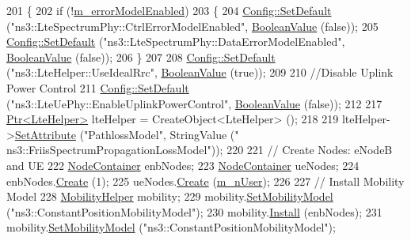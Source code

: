 \begin{DoxyCode}
201 \{
202   \textcolor{keywordflow}{if} (!\hyperlink{classLenaTdBetFfMacSchedulerTestCase1_a2762c9502708f6f310699f8195d81473}{m\_errorModelEnabled})
203     \{
204       \hyperlink{group__config_ga2e7882df849d8ba4aaad31c934c40c06}{Config::SetDefault} (\textcolor{stringliteral}{"ns3::LteSpectrumPhy::CtrlErrorModelEnabled"}, 
      \hyperlink{classns3_1_1BooleanValue}{BooleanValue} (\textcolor{keyword}{false}));
205       \hyperlink{group__config_ga2e7882df849d8ba4aaad31c934c40c06}{Config::SetDefault} (\textcolor{stringliteral}{"ns3::LteSpectrumPhy::DataErrorModelEnabled"}, 
      \hyperlink{classns3_1_1BooleanValue}{BooleanValue} (\textcolor{keyword}{false}));
206     \}
207 
208   \hyperlink{group__config_ga2e7882df849d8ba4aaad31c934c40c06}{Config::SetDefault} (\textcolor{stringliteral}{"ns3::LteHelper::UseIdealRrc"}, 
      \hyperlink{classns3_1_1BooleanValue}{BooleanValue} (\textcolor{keyword}{true}));
209 
210   \textcolor{comment}{//Disable Uplink Power Control}
211   \hyperlink{group__config_ga2e7882df849d8ba4aaad31c934c40c06}{Config::SetDefault} (\textcolor{stringliteral}{"ns3::LteUePhy::EnableUplinkPowerControl"}, 
      \hyperlink{classns3_1_1BooleanValue}{BooleanValue} (\textcolor{keyword}{false}));
212 
217   \hyperlink{classns3_1_1Ptr}{Ptr<LteHelper>} lteHelper = CreateObject<LteHelper> ();
218   
219   lteHelper->\hyperlink{classns3_1_1ObjectBase_ac60245d3ea4123bbc9b1d391f1f6592f}{SetAttribute} (\textcolor{stringliteral}{"PathlossModel"}, StringValue (\textcolor{stringliteral}{"
      ns3::FriisSpectrumPropagationLossModel"}));
220 
221   \textcolor{comment}{// Create Nodes: eNodeB and UE}
222   \hyperlink{classns3_1_1NodeContainer}{NodeContainer} enbNodes;
223   \hyperlink{classns3_1_1NodeContainer}{NodeContainer} ueNodes;
224   enbNodes.\hyperlink{classns3_1_1NodeContainer_a787f059e2813e8b951cc6914d11dfe69}{Create} (1);
225   ueNodes.\hyperlink{classns3_1_1NodeContainer_a787f059e2813e8b951cc6914d11dfe69}{Create} (\hyperlink{classLenaTdBetFfMacSchedulerTestCase1_a473de037622baa2f40e541ac9dd1b85c}{m\_nUser});
226 
227   \textcolor{comment}{// Install Mobility Model}
228   \hyperlink{classns3_1_1MobilityHelper}{MobilityHelper} mobility;
229   mobility.\hyperlink{classns3_1_1MobilityHelper_a030275011b6f40682e70534d30280aba}{SetMobilityModel} (\textcolor{stringliteral}{"ns3::ConstantPositionMobilityModel"});
230   mobility.\hyperlink{classns3_1_1MobilityHelper_a07737960ee95c0777109cf2994dd97ae}{Install} (enbNodes);
231   mobility.\hyperlink{classns3_1_1MobilityHelper_a030275011b6f40682e70534d30280aba}{SetMobilityModel} (\textcolor{stringliteral}{"ns3::ConstantPositionMobilityModel"});

\end{DoxyCode}
